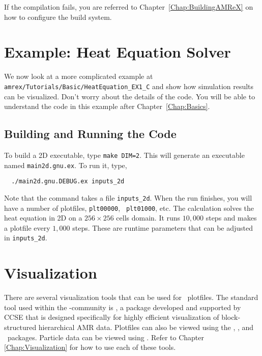 If the compilation fails, you are referred to
Chapter~\ref{Chap:BuildingAMReX} on how to configure the build
system.

\section{Example: Heat Equation Solver}\label{sec:heat equation}

We now look at a more complicated example at {\tt
  amrex/Tutorials/Basic/HeatEquation\_EX1\_C} and show how simulation
results can be visualized.  Don't worry about the details of the code.
You will be able to understand the code in this example after
Chapter~\ref{Chap:Basics}. 

\subsection{Building and Running the Code}

To build a 2D executable, type {\tt make DIM=2}.  This will generate
an executable named {\tt main2d.gnu.ex}.  To run it, type,
\begin{verbatim}
  ./main2d.gnu.DEBUG.ex inputs_2d
\end{verbatim}
Note that the command takes a file {\tt inputs\_2d}.  When the run
finishes, you will have a number of plotfiles, {\tt plt00000}, {\tt
  plt01000}, etc.  The calculation solves the heat equation in 2D on a
$256 \times 256$ cells domain.  It runs $10,000$ steps and makes a
plotfile every $1,000$ steps.  These are runtime parameters that can
be adjusted in {\tt inputs\_2d}.

\section{Visualization}
There are several visualization tools that can be used for \amrex\
plotfiles.  The standard tool used within the
\amrex-community is \amrvis, a package developed and supported 
by CCSE that is designed specifically for highly efficient visualization
of block-structured hierarchical AMR data.
Plotfiles can also be viewed using the \visit, \paraview, and \yt\ packages.
Particle data can be viewed using \paraview.
Refer to Chapter \ref{Chap:Visualization} for how to use each of these tools.

